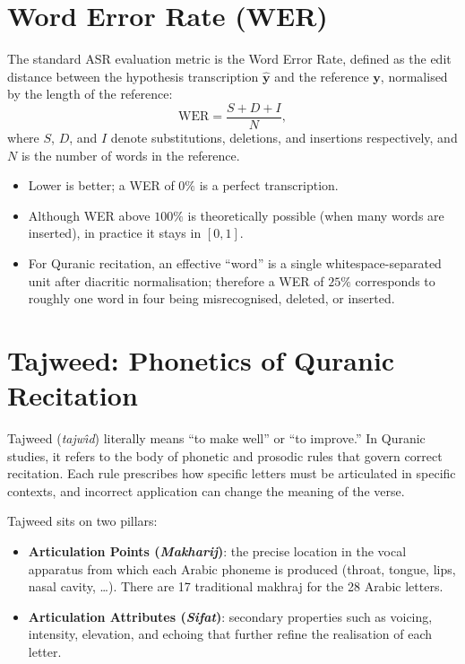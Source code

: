 \section{Word Error Rate (WER)}
\label{sec:mt_wer}

The standard ASR evaluation metric is the Word Error Rate, defined as the
edit distance between the hypothesis transcription $\hat{\mathbf{y}}$ and
the reference $\mathbf{y}$, normalised by the length of the reference:
\begin{equation}
\label{eq:mt_wer}
\mathrm{WER} = \frac{S + D + I}{N},
\end{equation}
where $S$, $D$, and $I$ denote substitutions, deletions, and insertions
respectively, and $N$ is the number of words in the reference.

\begin{itemize}
  \item Lower is better; a WER of $0\%$ is a perfect transcription.
  \item Although WER above $100\%$ is theoretically possible (when many
        words are inserted), in practice it stays in $[0,1]$.
  \item For Quranic recitation, an effective ``word'' is a single
        whitespace-separated unit after diacritic normalisation; therefore
        a WER of $25\%$ corresponds to roughly one word in four being
        misrecognised, deleted, or inserted.
\end{itemize}

\section{Tajweed: Phonetics of Quranic Recitation}
\label{sec:mt_tajweed}

\begin{emeraldbox}[title=Tajweed]
Tajweed (\textit{tajw{\^\i}d}) literally means ``to make well'' or ``to
improve.'' In Quranic studies, it refers to the body of phonetic and
prosodic rules that govern correct recitation. Each rule prescribes how
specific letters must be articulated in specific contexts, and incorrect
application can change the meaning of the verse.
\end{emeraldbox}

Tajweed sits on two pillars:
\begin{itemize}
  \item \textbf{Articulation Points (\textit{Makharij})}: the precise
        location in the vocal apparatus from which each Arabic phoneme is
        produced (throat, tongue, lips, nasal cavity, \dots). There are
        17 traditional makhraj for the 28 Arabic letters.
  \item \textbf{Articulation Attributes (\textit{Sifat})}: secondary
        properties such as voicing, intensity, elevation, and
        echoing that further refine the realisation of each letter.
\end{itemize}

